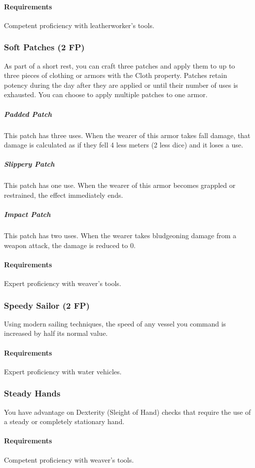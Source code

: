     \paragraph{Requirements} Competent proficiency with leatherworker's tools.
\subsubsection{Soft Patches (2 FP)} \label{feat::softpatches}
    As part of a short rest, you can craft three patches and apply them to up to three pieces of clothing or armors with the Cloth property.
    Patches retain potency during the day after they are applied or until their number of uses is exhausted.
    You can choose to apply multiple patches to one armor.
    \subparagraph{Padded Patch} This patch has three uses.
    When the wearer of this armor takes fall damage, that damage is calculated as if they fell 4 less meters (2 less dice) and it loses a use.
    \subparagraph{Slippery Patch} This patch has one use.
    When the wearer of this armor becomes grappled or restrained, the effect immediately ends.
    \subparagraph{Impact Patch} This patch has two uses.
    When the wearer takes bludgeoning damage from a weapon attack, the damage is reduced to 0.
    \paragraph{Requirements} Expert proficiency with weaver's tools.
\subsubsection{Speedy Sailor (2 FP)} \label{feat::speedysailor}
    Using modern sailing techniques, the speed of any vessel you command is increased by half its normal value.
    \paragraph{Requirements} Expert proficiency with water vehicles.
\subsubsection{Steady Hands} \label{feat::steadyhands}
    You have advantage on Dexterity (Sleight of Hand) checks that require the use of a steady or completely stationary hand.
    \paragraph{Requirements} Competent proficiency with weaver's tools.
